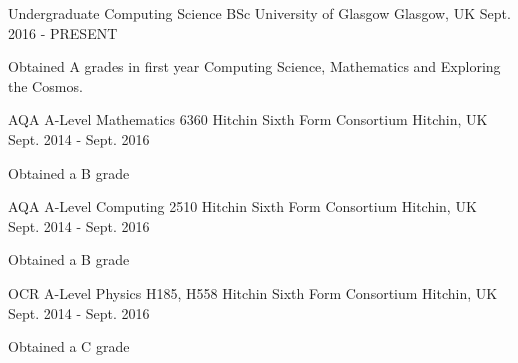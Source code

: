 


\begin{cventries}


\cventry
{Undergraduate Computing Science BSc} %
{University of Glasgow} %
{Glasgow, UK} %
{Sept. 2016 - PRESENT} %
{
\begin{cvitems}
\item {Obtained A grades in first year Computing Science, Mathematics and Exploring the Cosmos.}
\end{cvitems}
}

\cventry
{AQA A-Level Mathematics 6360} %
{Hitchin Sixth Form Consortium} %
{Hitchin, UK} %
{Sept. 2014 - Sept. 2016} %
{ %
\begin{cvitems}
\item {Obtained a B grade}
\end{cvitems}
}

\cventry
{AQA A-Level Computing 2510} %
{Hitchin Sixth Form Consortium} %
{Hitchin, UK} %
{Sept. 2014 - Sept. 2016} %
{ %
\begin{cvitems}
\item {Obtained a B grade}
\end{cvitems}
}

\cventry
{OCR A-Level Physics H185, H558} %
{Hitchin Sixth Form Consortium} %
{Hitchin, UK} %
{Sept. 2014 - Sept. 2016} %
{ %
\begin{cvitems}
\item {Obtained a C grade}
\end{cvitems}
}



\end{cventries}
